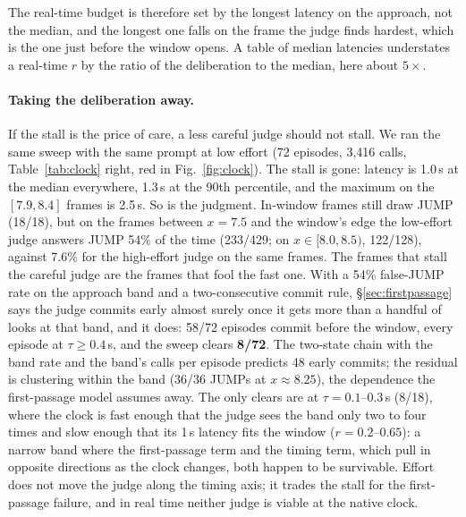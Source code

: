 \documentclass[11pt]{article}
\begin{document}
The real-time budget is therefore set by the longest latency on the
approach, not the median, and the longest one falls on the frame the judge
finds hardest, which is the one just before the window opens. A table of
median latencies understates a real-time $r$ by the ratio of the
deliberation to the median, here about $5\times$.

\paragraph{Taking the deliberation away.} If the stall is the price of
care, a less careful judge should not stall. We ran the same sweep with the
same prompt at low effort (72 episodes, 3{,}416 calls, Table~\ref{tab:clock}
right, red in Fig.~\ref{fig:clock}). The stall is gone: latency is 1.0\,s
at the median everywhere, 1.3\,s at the 90th percentile, and the maximum on
the $[7.9, 8.4]$ frames is 2.5\,s. So is the judgment. In-window frames
still draw JUMP (18/18), but on the frames between $x = 7.5$ and the
window's edge the low-effort judge answers JUMP 54\% of the time (233/429;
on $x \in [8.0, 8.5)$, 122/128), against 7.6\% for the high-effort judge
on the same frames. The frames that stall the careful judge are the frames
that fool the fast one. With a 54\% false-JUMP rate on the approach band
and a two-consecutive commit rule, \S\ref{sec:firstpassage} says the
judge commits early almost surely once it gets more than a handful of looks
at that band, and it does: 58/72 episodes commit before the window, every
episode at $\tau \ge 0.4$\,s, and the sweep clears \textbf{8/72}. The
two-state chain with the band rate and the band's calls per episode
predicts 48 early commits; the residual is clustering within the band
(36/36 JUMPs at $x \approx 8.25$), the dependence the first-passage model
assumes away. The only clears are at $\tau = 0.1$--$0.3$\,s (8/18), where
the clock is fast enough that the judge sees the band only two to four times
and slow enough that its 1\,s latency fits the window ($r = 0.2$--$0.65$):
a narrow band where the first-passage term and the timing term, which pull
in opposite directions as the clock changes, both happen to be survivable.
Effort does not move the judge along the timing axis; it trades the stall
for the first-passage failure, and in real time neither judge is viable at
the native clock.
\end{document}
